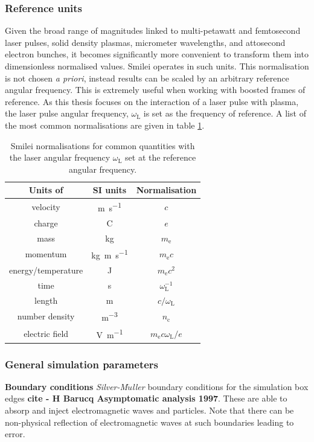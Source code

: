 \subsubsection{Reference units}
Given the broad range of magnitudes linked to multi-petawatt and femtosecond laser pulses, solid density plasmas, micrometer wavelengths, and attosecond electron bunches, it becomes significantly more convenient to transform them into dimensionless normalised values. Smilei operates in such units. This normalisation is not chosen \textit{a priori}, instead results can be scaled by an arbitrary reference angular frequency. This is extremely useful when working with boosted frames of reference. As this thesis focuses on the interaction of a laser pulse with plasma, the laser pulse angular frequency, $\omega_\mathrm{L}$ is set as the frequency of reference. A list of the most common normalisations are given in table \ref{tab:intro-normalisations}.

\begin{table}
\begin{center}
\begin{tabular}{ccc}
	 \hline \hline
	Units of & SI units & Normalisation \\
	\hline
	velocity & \unit{m.s^{-1}} & $c$ \\
	charge & C & $e$ \\
	mass & kg & $m_\mathrm{e}$ \\
	momentum & \unit{kg.m.s^{-1}} & $m_\mathrm{e}c$ \\
	energy/temperature & J & $m_\mathrm{e}c^2$ \\
	time & s & $\omega^{-1}_\mathrm{L}$ \\
	length & m & $c/\omega_\mathrm{L}$ \\
	number density & \unit{m^{-3}} & $n_\mathrm{c}$ \\
	electric field & \unit{V.m^{-1}} & $m_\mathrm{e}c\omega_\mathrm{L}/e$ \\
	\hline \hline
\end{tabular}
	\caption{\label{tab:intro-normalisations} Smilei normalisations for common quantities with the laser angular frequency $\omega_\mathrm{L}$ set at the reference angular frequency.}
\end{center}
\end{table}

\subsubsection{General simulation parameters}\label{sec:intro-general_simulation_paramers}
\textbf{Boundary conditions}
\textit{Silver-M$\ddot{u}$ller }boundary conditions for the simulation box edges \textbf{cite - H Barucq Asymptomatic analysis 1997}. These are able to absorp and inject electromagnetic waves and particles. Note that there can be non-physical reflection of electromagnetic waves at such boundaries leading to error.


